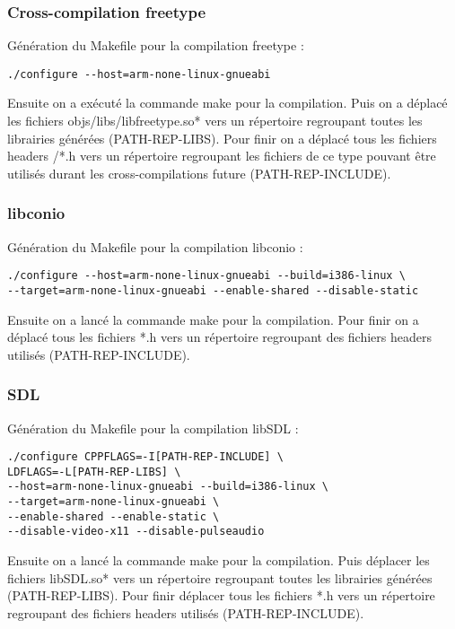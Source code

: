 \subsubsection{Cross-compilation freetype}
Génération du Makefile pour la compilation freetype :

\begin{lstlisting}
./configure --host=arm-none-linux-gnueabi
\end{lstlisting}

Ensuite on a exécuté la commande make pour la compilation.
Puis on a déplacé les fichiers objs/libs/libfreetype.so* vers un répertoire regroupant toutes les librairies générées (PATH-REP-LIBS).
Pour finir on a déplacé tous les fichiers headers /*.h vers un répertoire regroupant les fichiers de ce type pouvant être utilisés durant les cross-compilations future (PATH-REP-INCLUDE).

\subsubsection{libconio}
Génération du Makefile pour la compilation libconio :

\begin{lstlisting}
./configure --host=arm-none-linux-gnueabi --build=i386-linux \
--target=arm-none-linux-gnueabi --enable-shared --disable-static
\end{lstlisting}
Ensuite on a lancé la commande make pour la compilation.
Pour finir on a déplacé tous les fichiers *.h vers un répertoire regroupant des fichiers headers utilisés (PATH-REP-INCLUDE).

\subsubsection{SDL}
Génération du Makefile pour la compilation libSDL :

\begin{lstlisting}
./configure CPPFLAGS=-I[PATH-REP-INCLUDE] \ 
LDFLAGS=-L[PATH-REP-LIBS] \
--host=arm-none-linux-gnueabi --build=i386-linux \ 
--target=arm-none-linux-gnueabi \
--enable-shared --enable-static \
--disable-video-x11 --disable-pulseaudio
\end{lstlisting}

Ensuite on a lancé la commande make pour la compilation.
Puis déplacer les fichiers libSDL.so* vers un répertoire regroupant toutes les librairies générées (PATH-REP-LIBS).
Pour finir déplacer tous les fichiers *.h vers un répertoire regroupant des fichiers headers utilisés (PATH-REP-INCLUDE).

